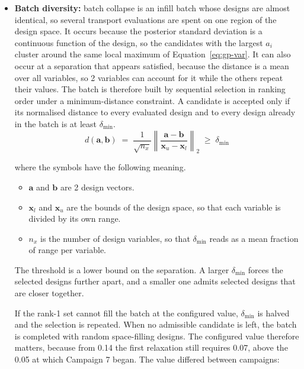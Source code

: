 \begin{itemize}
  \item \textbf{Batch diversity:} batch collapse is an infill batch
        whose designs are almost identical, so several transport
        evaluations are spent on one region of the design space. It
        occurs because the posterior standard deviation is a continuous
        function of the design, so the candidates with the largest $a_i$
        cluster around the same local maximum of
        Equation~\eqref{eq:gp-var}. It can also occur at a separation
        that appears satisfied, because the distance is a mean over all
        variables, so 2 variables can account for it while the others
        repeat their values. The batch is therefore built by sequential
        selection in ranking order under a minimum-distance constraint.
        A candidate is accepted only if its normalised distance to every
        evaluated design and to every design already in the batch is at
        least $\delta_\mathrm{min}$.
        \begin{equation}
        d(\mathbf{a},\mathbf{b}) \;=\;
        \frac{1}{\sqrt{n_x}}
        \left\lVert \frac{\mathbf{a}-\mathbf{b}}
        {\mathbf{x}_u-\mathbf{x}_l} \right\rVert_2
        \;\ge\; \delta_\mathrm{min}
        \label{eq:batch-div}
        \end{equation}

        \noindent where the symbols have the following meaning.

        \begin{itemize}
          \item $\mathbf{a}$ and $\mathbf{b}$ are 2 design vectors.
          \item $\mathbf{x}_l$ and $\mathbf{x}_u$ are the bounds of the
                design space, so that each variable is divided by its own
                range.
          \item $n_x$ is the number of design variables, so that
                $\delta_\mathrm{min}$ reads as a mean fraction of range per
                variable.
        \end{itemize}

        The threshold is a lower bound on the separation. A larger
        $\delta_\mathrm{min}$ forces the selected designs further apart,
        and a smaller one admits selected designs that are closer
        together.

        If the rank-1 set cannot fill the batch at the configured
        value, $\delta_\mathrm{min}$ is halved and the selection is
        repeated. When no admissible candidate is left, the batch is
        completed with random space-filling designs. The configured
        value therefore matters, because from 0.14 the first relaxation
        still requires 0.07, above the 0.05 at which Campaign 7 began.
        The value differed between campaigns:


\end{itemize}
